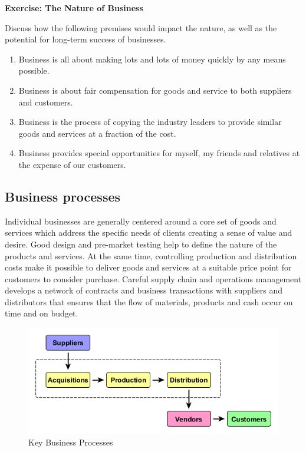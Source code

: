 \documentclass[]{book}
\providecommand{\tightlist}{%
  \setlength{\itemsep}{0pt}\setlength{\parskip}{0pt}}
\let\BeginKnitrBlock\begin \let\EndKnitrBlock\end
\begin{document}
\BeginKnitrBlock{rmdexercise}
\textbf{Exercise: The Nature of Business}

Discuss how the following premises would impact the nature, as well as the potential for long-term success of businesses.

\begin{enumerate}
\def\labelenumi{\arabic{enumi}.}
\tightlist
\item
  Business is all about making lots and lots of money quickly by any means possible.
\item
  Business is about fair compensation for goods and service to both suppliers and customers.
\item
  Business is the process of copying the industry leaders to provide similar goods and services at a fraction of the cost.
\item
  Business provides special opportunities for myself, my friends and relatives at the expense of our customers.
\end{enumerate}
\EndKnitrBlock{rmdexercise}

\hypertarget{business-processes}{%
\subsection{Business processes}\label{business-processes}}

Individual businesses are generally centered around a core set of goods and services which address the specific needs of clients creating a sense of value and desire. Good design and pre-market testing help to define the nature of the products and services. At the same time, controlling production and distribution costs make it possible to deliver goods and services at a suitable price point for customers to consider purchase. Careful supply chain and operations management develops a network of contracts and business transactions with suppliers and distributors that ensures that the flow of materials, products and cash occur on time and on budget.

\begin{figure}
\centering
\includegraphics{images/businessprocess.png}
\caption{Key Business Processes}
\end{figure}
\end{document}
